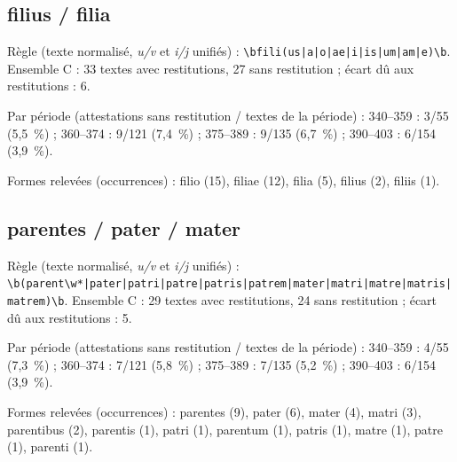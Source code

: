 \subsection*{filius / filia}
\noindent Règle (texte normalisé, \textit{u/v} et \textit{i/j} unifiés) : \texttt{\small \textbackslash{}bfili(\allowbreak{}us|\allowbreak{}a|\allowbreak{}o|\allowbreak{}ae|\allowbreak{}i|\allowbreak{}is|\allowbreak{}um|\allowbreak{}am|\allowbreak{}e)\textbackslash{}b}. Ensemble C : 33 textes avec restitutions, 27 sans restitution ; écart dû aux restitutions : 6.\par
\noindent Par période (attestations sans restitution / textes de la période) : 340–359 : 3/55 (5,5~\%) ; 360–374 : 9/121 (7,4~\%) ; 375–389 : 9/135 (6,7~\%) ; 390–403 : 6/154 (3,9~\%).\par
\noindent Formes relevées (occurrences) : filio (15), filiae (12), filia (5), filius (2), filiis (1).\par
{}\par\medskip
\subsection*{parentes / pater / mater}
\noindent Règle (texte normalisé, \textit{u/v} et \textit{i/j} unifiés) : \texttt{\small \textbackslash{}b(\allowbreak{}parent\textbackslash{}w*|\allowbreak{}pater|\allowbreak{}patri|\allowbreak{}patre|\allowbreak{}patris|\allowbreak{}patrem|\allowbreak{}mater|\allowbreak{}matri|\allowbreak{}matre|\allowbreak{}matris|\allowbreak{}matrem)\textbackslash{}b}. Ensemble C : 29 textes avec restitutions, 24 sans restitution ; écart dû aux restitutions : 5.\par
\noindent Par période (attestations sans restitution / textes de la période) : 340–359 : 4/55 (7,3~\%) ; 360–374 : 7/121 (5,8~\%) ; 375–389 : 7/135 (5,2~\%) ; 390–403 : 6/154 (3,9~\%).\par
\noindent Formes relevées (occurrences) : parentes (9), pater (6), mater (4), matri (3), parentibus (2), parentis (1), patri (1), parentum (1), patris (1), matre (1), patre (1), parenti (1).\par
{}\par\medskip
